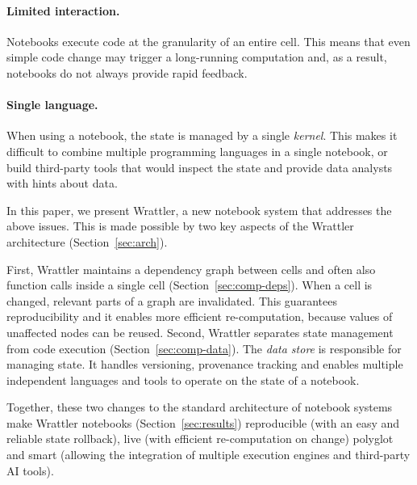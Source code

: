 \documentclass[sigplan]{acmart}\settopmatter{printfolios=true,printccs=false,printacmref=false}
\begin{document}
\paragraph{Limited interaction.} Notebooks execute code at the granularity of an entire cell. 
This means that even simple code change may trigger a long-running computation and, as a result, 
notebooks do not always provide rapid feedback.

\paragraph{Single language.} When using a notebook, the state is managed by a single \emph{kernel}.
This makes it difficult to combine multiple programming languages in a single notebook, or build
third-party tools that would inspect the state and provide data analysts with hints about data.

\vspace{1em}
\noindent
In this paper, we present Wrattler, a new notebook system that addresses the above issues.
This is made possible by two key aspects of the Wrattler architecture (Section~\ref{sec:arch}). 

First, Wrattler maintains a dependency graph between cells and often also function calls inside
a single cell (Section~\ref{sec:comp-deps}). When a cell is changed, relevant parts of a graph
are invalidated. This guarantees reproducibility and it enables more efficient re-computation, 
because values of unaffected nodes can be reused.
Second, Wrattler separates state management from code execution (Section~\ref{sec:comp-data}). 
The \emph{data store} is responsible for managing state. It handles versioning, provenance tracking 
and enables multiple independent languages and tools to operate on the state of a notebook. 

Together, these two changes to the standard architecture of notebook systems make Wrattler notebooks
(Section~\ref{sec:results}) reproducible (with an easy and reliable state rollback), live (with 
efficient re-computation on change) polyglot and smart (allowing the integration of multiple 
execution engines and third-party AI tools). 
\end{document}
